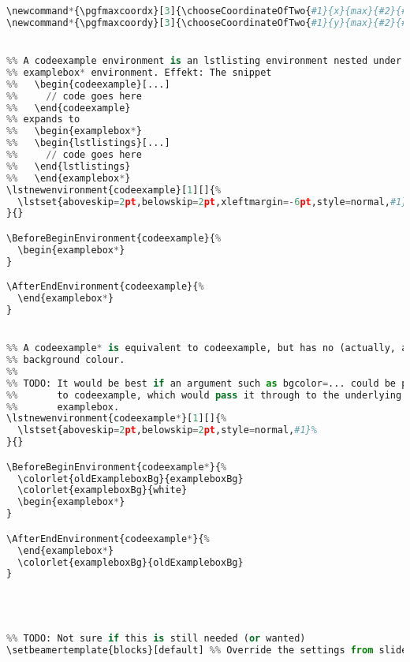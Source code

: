 {\begin{lstlisting}[language=Python,style=normal,escapechar=?,morekeywords={True, False}, mathescape]
\newcommand*{\pgfmaxcoordx}[3]{\chooseCoordinateOfTwo{#1}{x}{max}{#2}{#3}}
\newcommand*{\pgfmaxcoordy}[3]{\chooseCoordinateOfTwo{#1}{y}{max}{#2}{#3}}


%% A codeexample environment is an lstlisting environment nested under an
%% examplebox* environment. Effekt: The snippet
%%   \begin{codeexample}[...]
%%     // code goes here
%%   \end{codeexample}
%% expands to
%%   \begin{examplebox*}
%%   \begin{lstlistings}[...]
%%     // code goes here
%%   \end{lstlistings}
%%   \end{examplebox*}
\lstnewenvironment{codeexample}[1][]{%
  \lstset{aboveskip=2pt,belowskip=2pt,xleftmargin=-6pt,style=normal,#1}%
}{}

\BeforeBeginEnvironment{codeexample}{%
  \begin{examplebox*}
}

\AfterEndEnvironment{codeexample}{%
  \end{examplebox*}
}


%% A codeexample* is equivalent to codeexample, but has no (actually, a white)
%% background colour.
%%
%% TODO: It would be best if an argument such as bgcolor=... could be passed
%%       to codeexample, which would pass it through to the underlying
%%       examplebox.
\lstnewenvironment{codeexample*}[1][]{%
  \lstset{aboveskip=2pt,belowskip=2pt,style=normal,#1}%
}{}

\BeforeBeginEnvironment{codeexample*}{%
  \colorlet{oldExampleboxBg}{exampleboxBg}
  \colorlet{exampleboxBg}{white}
  \begin{examplebox*}
}

\AfterEndEnvironment{codeexample*}{%
  \end{examplebox*}
  \colorlet{exampleboxBg}{oldExampleboxBg}
}




%% TODO: Not sure if this is still needed (or wanted)
\setbeamertemplate{blocks}[default] %% Override the settings from slides.tex



\end{lstlisting}}

